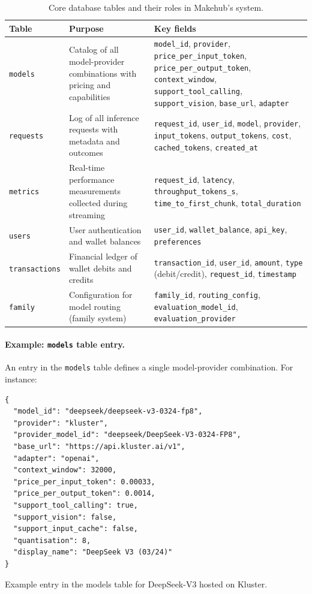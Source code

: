 \documentclass[english]{article}
\begin{document}
\begin{table}[H]
\centering
\caption{Core database tables and their roles in Makehub's system.}
\label{tab:db_schema}
\begin{tabular}{|l|p{9cm}|l|}
\hline
\textbf{Table} & \textbf{Purpose} & \textbf{Key fields} \\
\hline
\texttt{models} & Catalog of all model-provider combinations with pricing and capabilities & \texttt{model\_id}, \texttt{provider}, \texttt{price\_per\_input\_token}, \texttt{price\_per\_output\_token}, \texttt{context\_window}, \texttt{support\_tool\_calling}, \texttt{support\_vision}, \texttt{base\_url}, \texttt{adapter} \\
\hline
\texttt{requests} & Log of all inference requests with metadata and outcomes & \texttt{request\_id}, \texttt{user\_id}, \texttt{model}, \texttt{provider}, \texttt{input\_tokens}, \texttt{output\_tokens}, \texttt{cost}, \texttt{cached\_tokens}, \texttt{created\_at} \\
\hline
\texttt{metrics} & Real-time performance measurements collected during streaming & \texttt{request\_id}, \texttt{latency}, \texttt{throughput\_tokens\_s}, \texttt{time\_to\_first\_chunk}, \texttt{total\_duration} \\
\hline
\texttt{users} & User authentication and wallet balances & \texttt{user\_id}, \texttt{wallet\_balance}, \texttt{api\_key}, \texttt{preferences} \\
\hline
\texttt{transactions} & Financial ledger of wallet debits and credits & \texttt{transaction\_id}, \texttt{user\_id}, \texttt{amount}, \texttt{type} (debit/credit), \texttt{request\_id}, \texttt{timestamp} \\
\hline
\texttt{family} & Configuration for model routing (family system) & \texttt{family\_id}, \texttt{routing\_config}, \texttt{evaluation\_model\_id}, \texttt{evaluation\_provider} \\
\hline
\end{tabular}
\end{table}

\paragraph{Example: \texttt{models} table entry.}

An entry in the \texttt{models} table defines a single model-provider combination. For instance:

\begin{listing}[H]
\begin{verbatim}
{
  "model_id": "deepseek/deepseek-v3-0324-fp8",
  "provider": "kluster",
  "provider_model_id": "deepseek/DeepSeek-V3-0324-FP8",
  "base_url": "https://api.kluster.ai/v1",
  "adapter": "openai",
  "context_window": 32000,
  "price_per_input_token": 0.00033,
  "price_per_output_token": 0.0014,
  "support_tool_calling": true,
  "support_vision": false,
  "support_input_cache": false,
  "quantisation": 8,
  "display_name": "DeepSeek V3 (03/24)"
}
\end{verbatim}
\caption{Example entry in the models table for DeepSeek-V3 hosted on Kluster.}
\end{listing}
\end{document}
